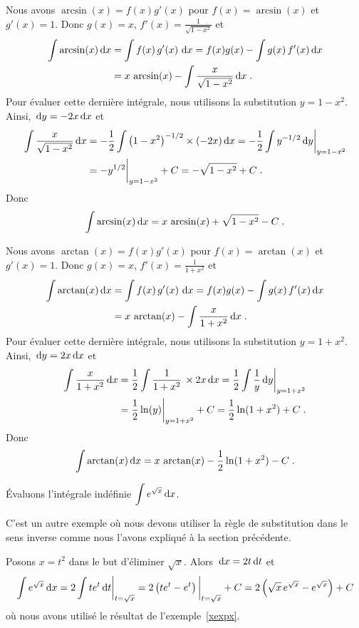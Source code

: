 {\begin{egg}[\eng]
 Nous avons $\arcsin(x) = f(x) g'(x)$ pour $f(x)=\arcsin(x)$ et
$g'(x) = 1$. Donc $g(x) = x$,
$\displaystyle f'(x) = \frac{1}{\sqrt{1-x^2}}$ et
\begin{align*}
\int \arcsin(x)\,\mathrm{d}x &= \int f(x)\,g'(x)\,\,\mathrm{d}x
= f(x)g(x) - \int g(x)\,f'(x) \,\mathrm{d}x \\
&= x\,\arcsin(x) - \int \frac{x}{\sqrt{1-x^2}} \,\mathrm{d}x \; .
\end{align*}
Pour évaluer cette dernière intégrale, nous utilisons la substitution
$y= 1-x^2$.  Ainsi, $\,\mathrm{d}y = -2 x \,\mathrm{d}x$ et
\begin{align*}
\int \frac{x}{\sqrt{1-x^2}} \,\mathrm{d}x
&= - \frac{1}{2} \int \left(1-x^2\right)^{-1/2} \times (-2 x) \,\mathrm{d}x
= -\frac{1}{2} \int y^{-1/2} \,\mathrm{d}y \bigg|_{y=1-x^2} \\
&= - y^{1/2} \bigg|_{y=1-x^2} + C
= -\sqrt{1-x^2} + C \; .
\end{align*}
Donc
\[
\int \arcsin(x)\,\mathrm{d}x = x\,\arcsin(x) + \sqrt{1-x^2} - C \; .
\]

 Nous avons $\arctan(x) = f(x) g'(x)$ pour $f(x)=\arctan(x)$ et
$g'(x) = 1$. Donc $g(x) = x$, $\displaystyle f'(x) = \frac{1}{1+x^2}$
et
\begin{align*}
\int \arctan(x)\,\mathrm{d}x &= \int f(x)\,g'(x)\,\,\mathrm{d}x
= f(x)g(x) - \int g(x)\,f'(x) \,\mathrm{d}x \\
&= x\,\arctan(x) - \int \frac{x}{1+x^2} \,\mathrm{d}x \; .
\end{align*}
Pour évaluer cette dernière intégrale, nous utilisons la substitution
$y= 1+x^2$.  Ainsi, $\,\mathrm{d}y = 2 x \,\mathrm{d}x$ et
\begin{align*}
\int \frac{x}{1+x^2} \,\mathrm{d}x
&= \frac{1}{2} \int \frac{1}{1+x^2}\, \times 2 x \,\mathrm{d}x
= \frac{1}{2} \int \frac{1}{y} \,\mathrm{d}y \bigg|_{y=1+x^2} \\
&= \frac{1}{2} \ln(y) \bigg|_{y=1+x^2} + C
= \frac{1}{2} \ln(1+x^2) + C \; .
\end{align*}
Donc
\[
\int \arctan(x)\,\mathrm{d}x = x\,\arctan(x) - \frac{1}{2}\ln(1+x^2) - C \; .
\]
\end{egg}

\begin{egg}
Évaluons l'intégrale indéfinie $\displaystyle \int e^{\sqrt{x}} \,\mathrm{d}x$.

C'est un autre exemple où nous devons utiliser la règle de
substitution dans le sens inverse comme nous l'avons expliqué à la
section précédente.

Posons $x = t^2$ dans le but d'éliminer $\sqrt{x}$.  Alors
$\,\mathrm{d}x = 2t \,\mathrm{d}t$ et
\[
\int e^{\sqrt{x}} \,\mathrm{d}x = 2 \int t e^t \,\mathrm{d}t \bigg|_{t=\sqrt{x}}
= 2 \left( t e^t - e^t \right)\bigg|_{t=\sqrt{x}} + C
= 2 \left( \sqrt{x}\, e^{\sqrt{x}} - e^{\sqrt{x}} \right) + C
\]
où nous avons utilisé le résultat de l'exemple~\ref{xexpx}.
\end{egg}

}
